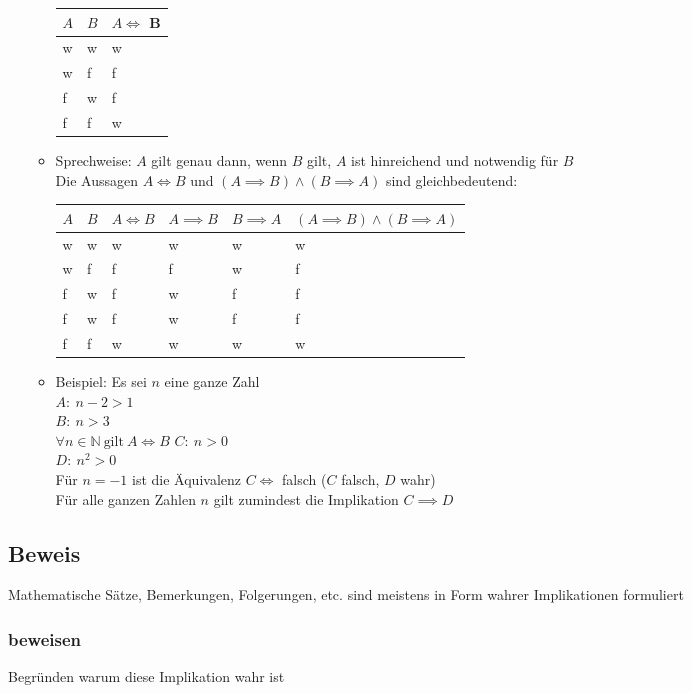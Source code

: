 \documentclass[a4paper]{scrartcl}
\DeclareMathOperator{\Forall}{\forall}
\theoremstyle{definition}
\theoremstyle{plain}
\theoremstyle{plain}
\theoremstyle{remark}
\theoremstyle{remark}
\theoremstyle{remark}
\theoremstyle{remark}
\theoremstyle{remark}
\begin{document}
\begin{itemize}
\begin{itemize}
\begin{center}
\begin{tabular}{lll}
$A$ & $B$ & $A\iff$ B\\
\hline
w & w & w\\
w & f & f\\
f & w & f\\
f & f & w\\
\end{tabular}
\end{center}
\item Sprechweise: $A$ gilt genau dann, wenn $B$ gilt, $A$ ist hinreichend und notwendig für $B$ \\
           Die Aussagen $A\iff B$ und $(A\implies B)\wedge (B\implies A)$ sind gleichbedeutend:
\begin{center}
\begin{tabular}{llllll}
$A$ & $B$ & $A\iff B$ & $A\implies B$ & $B\implies A$ & $(A\implies B)\wedge (B\implies A)$\\
\hline
w & w & w & w & w & w\\
w & f & f & f & w & f\\
f & w & f & w & f & f\\
f & w & f & w & f & f\\
f & f & w & w & w & w\\
\end{tabular}
\end{center}
\item Beispiel: Es sei $n$ eine ganze Zahl \\
           $A:~n-2>1$ \\
           $B:~n>3$ \\
           $\Forall n\in\mathbb{N}~\text{gilt}~A\iff B$
           $C:~n>0$ \\
           $D:~n^2>0$ \\
           Für $n=-1$ ist die Äquivalenz $C\iff$ falsch ($C$ falsch, $D$ wahr) \\
           Für alle ganzen Zahlen $n$ gilt zumindest die Implikation $C\implies D$
\end{itemize}
\end{itemize}
\subsection{Beweis}
\label{sec-2-2}
Mathematische Sätze, Bemerkungen, Folgerungen, etc. sind meistens in Form wahrer Implikationen formuliert
\subsubsection{beweisen}
\label{sec-2-2-1}
Begründen warum diese Implikation wahr ist
\end{document}
